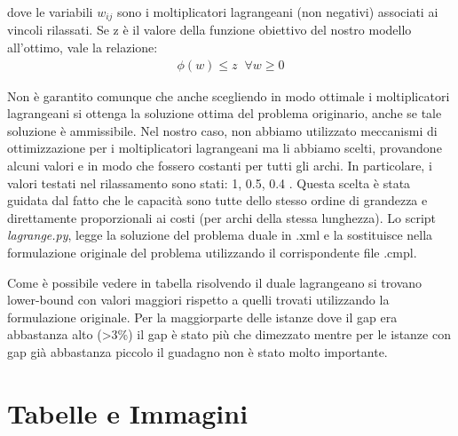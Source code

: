 \documentclass{article}
\begin{document}
dove le variabili $w_{ij}$ sono i moltiplicatori lagrangeani (non negativi) associati ai vincoli rilassati.
Se z è il valore della funzione obiettivo del nostro modello all'ottimo, vale la relazione:
\begin{align}
 \phi(w) \leq z \; \;     \forall w \geq 0
\end{align}

Non è garantito comunque che anche scegliendo in modo ottimale i moltiplicatori lagrangeani si ottenga la soluzione ottima del problema originario, anche se tale soluzione è ammissibile. 
Nel nostro caso, non abbiamo utilizzato meccanismi di ottimizzazione per i moltiplicatori lagrangeani ma li abbiamo scelti, provandone alcuni valori e in modo che fossero costanti per tutti gli archi. In particolare, i valori testati nel rilassamento sono stati: 1, 0.5, 0.4 .
Questa scelta è stata guidata dal fatto che le capacità sono tutte dello stesso ordine di grandezza e direttamente proporzionali ai costi (per archi della stessa lunghezza). Lo script \emph{lagrange.py}, legge la soluzione del problema duale in .xml e la sostituisce nella formulazione originale del problema utilizzando il corrispondente file .cmpl.

Come è possibile vedere in tabella  risolvendo il duale lagrangeano si trovano lower-bound con valori maggiori rispetto a quelli trovati utilizzando la formulazione originale. Per la maggiorparte delle istanze dove il gap era abbastanza alto (>3\%) il gap è stato più che dimezzato mentre per le istanze con gap già abbastanza piccolo il guadagno non è stato molto importante.


\clearpage

\section{Tabelle e Immagini}
\label{appendice}
\end{document}

